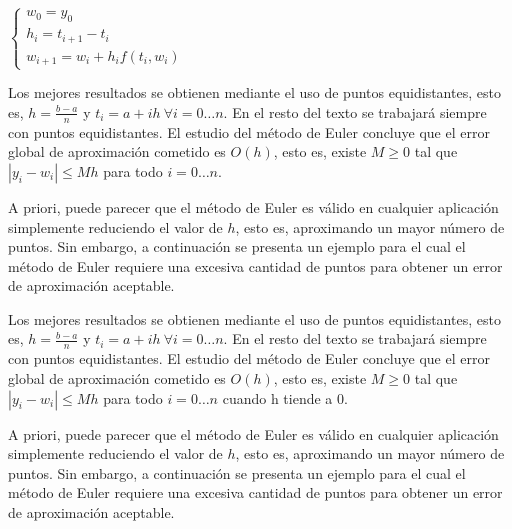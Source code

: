\documentclass{article}
\theoremstyle{theorem-style}  %
\theoremstyle{definition-style}
\theoremstyle{example-style}
\begin{document}
	\begin{center}
		$\begin{cases}
		w_0=y_0 \\
		h_{i} = t_{i+1} - t_i \\
		w_{i+1} = w_i + h_{i} f(t_i,w_i)
		\end{cases}$
	\end{center}

	Los mejores resultados se obtienen mediante el uso de puntos equidistantes, esto es, $h = \frac{b-a}{n}$ y $t_i = a + ih \ \forall i = 0 \ldots n$. En el resto del texto se trabajará siempre con puntos equidistantes. El estudio del método de Euler concluye que el error global de aproximación cometido es $O(h)$, esto es, existe $M \ge 0$ tal que $\left|y_i - w_i\right| \le Mh$ para todo $i=0 \ldots n$.

	A priori, puede parecer que el método de Euler es válido en cualquier aplicación simplemente reduciendo el valor de $h$, esto es, aproximando un mayor número de puntos. Sin embargo, a continuación se presenta un ejemplo para el cual el método de Euler requiere una excesiva cantidad de puntos para obtener un error de aproximación aceptable.


	Los mejores resultados se obtienen mediante el uso de puntos equidistantes, esto es, $h = \frac{b-a}{n}$ y $t_i = a + ih \ \forall i = 0 \ldots n$. En el resto del texto se trabajará siempre con puntos equidistantes. El estudio del método de Euler concluye que el error global de aproximación cometido es $O(h)$, esto es, existe $M \ge 0$ tal que $\left|y_i - w_i\right| \le Mh$ para todo $i=0 \ldots n$ cuando h tiende a 0.

	A priori, puede parecer que el método de Euler es válido en cualquier aplicación simplemente reduciendo el valor de $h$, esto es, aproximando un mayor número de puntos. Sin embargo, a continuación se presenta un ejemplo para el cual el método de Euler requiere una excesiva cantidad de puntos para obtener un error de aproximación aceptable.
\end{document}
